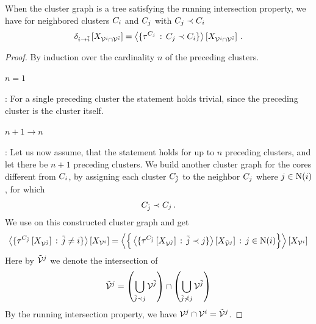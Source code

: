 \begin{lemma}\label{lem:clusterContractionMessage}
	When the cluster graph is a tree satisfying the running intersection property, we have for neighbored clusters $C_{i}$ and $C_{j}$ with $C_{j}\prec C_{i}$
	\begin{align*}
		\delta_{i \rightarrow \tilde{i}}\left[X_{\mathcal{V}^{i}\cap\mathcal{V}^{\tilde{i}}}\right]
		= \left\langle \{\tau^{C_{j}}\,:\,C_{j}\prec C_{i}\}\right\rangle \left[ X_{\mathcal{V}^{i}\cap\mathcal{V}^{\tilde{i}}} \right]   \, .
	\end{align*}
\end{lemma}
\begin{proof}
	By induction over the cardinality $n$ of the preceding clusters.
	\paragraph{$n=1$}: For a single preceding cluster the statement holds trivial, since the preceding cluster is the cluster itself.

	\paragraph{$n+1\rightarrow n$}: Let us now assume, that the statement holds for up to $n$ preceding clusters, and let there be $n+1$ preceding clusters.
	We build another cluster graph for the cores different from $C_{i}$, by assigning each cluster $C_{\tilde{j}}$ to the neighbor $C_{j}$ where $j\in\mathrm{N}(i)$, for which
	\begin{align*}
		C_{\tilde{j}}\prec C_{j} \, .
	\end{align*}
	We use  on this constructed cluster graph and get
	\begin{align*}
		\left\langle \{\tau^{C_{\tilde{j}}}\left[X_{\mathcal{V}^{\tilde{j}}}\right] \, : \, \tilde{j}\neq i\}\right\rangle \left[ X_{\mathcal{V}^{i}} \right]
		= \left\langle 
			\Big\{ \left\langle 
				\{\tau^{C_{\tilde{j}}}\left[X_{\mathcal{V}^{\tilde{j}}}\right] \, : \, \tilde{j}\prec j\}
			\right\rangle \left[ X_{\tilde{\mathcal{V}}^{j}} \right]
			\, : \, j\in\mathrm{N}(i) \Big\}
			\right\rangle \left[ X_{\mathcal{V}^{i}} \right]
	\end{align*}
	Here by $\tilde{\mathcal{V}}^{j}$ we denote the intersection of
	\begin{align*}
		\tilde{\mathcal{V}}^{j} = \left(\bigcup_{\tilde{j}\prec j} \mathcal{V}^{\tilde{j}}\right) \cap \left(\bigcup_{\tilde{j}\nprec j} \mathcal{V}^{\tilde{j}}\right)
	\end{align*}
	By the running intersection property, we have $\mathcal{V}^{j}\cap\mathcal{V}^{i}=\tilde{\mathcal{V}}^{j}$.


\end{proof}
